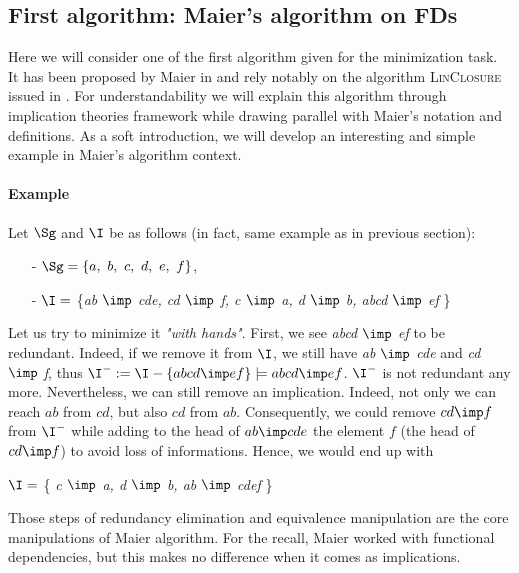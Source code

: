 \subsection{First algorithm: Maier's algorithm on FDs}

Here we will consider one of the first algorithm given for the minimization 
task. It has been proposed by Maier in \cite{maier_theory_1983, 
david_minimum_1980} and rely notably on the algorithm \textsc{LinClosure} issued
in \cite{beeri_computational_1979}. For understandability we will explain this
algorithm through implication theories framework while drawing parallel with
Maier's notation and definitions. As a soft introduction, we will develop an
interesting and simple example in Maier's algorithm context.


\paragraph{Example} Let $\Sg$ and $\I$ be as follows (in fact, same example as 
in previous section):
\begin{itemize}
	\item[-] $\Sg = \{a, \ b, \ c, \ d, \ e, \ f \}$,
	\item[-] $\I =$ \{\textit{ab $\imp$ cde, cd $\imp$ f, c $\imp$ a, d $\imp$ b, abcd $\imp$ ef} \} 
\end{itemize}
\noindent Let us try to minimize it \textit{"with hands"}. First, we see \textit{abcd $\imp$ ef} to be redundant. Indeed, if we remove it from $\I$, we still have \textit{ab $\imp$ cde} and \textit{cd $\imp$ f}, thus $\I^{-} := \I - \{ abcd \imp ef \} \models abcd \imp ef$. $\I^{-}$ is not redundant any more. 
Nevertheless, we can still remove an implication. Indeed, not only we can reach 
$ab$ from $cd$, but also $cd$ from $ab$. Consequently, we could remove $cd \imp 
f$ from $\I^{-}$ while adding to the head of $ab \imp cde$ the element
$f$ (the head of $cd \imp f$) to avoid loss of informations. Hence, we 
would end up with 
\begin{center}
	$\I =$ \{ \textit{c $\imp$ a, d $\imp$ b, ab $\imp$ cdef} \}
\end{center}

\vspace{1.2em}

Those steps of redundancy elimination and equivalence manipulation are the core 
manipulations of Maier algorithm. For the recall, Maier worked with functional
dependencies, but this makes no difference when it comes as implications. 

